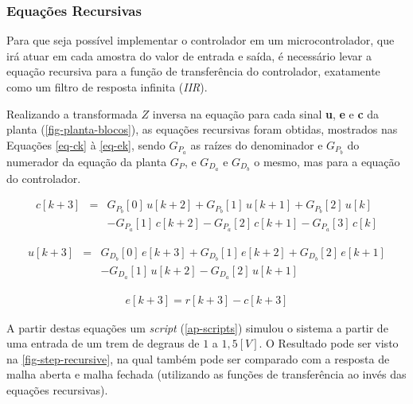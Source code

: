 \documentclass[
	12pt,				%
	article,			%
	openright,			%
	oneside,
	a4paper,			%
	chapter=TITLE,		%
	section=TITLE,		%
	english,			%
	french,				%
	spanish,			%
	brazil,				%
]{abntex2}
\begin{document}
            \subsubsection{Equações Recursivas}
            
                Para que seja possível implementar o controlador em um microcontrolador, que irá atuar em cada amostra do valor de entrada e saída, é necessário levar a equação recursiva para a função de transferência do controlador, exatamente como um filtro de resposta infinita (\textit{IIR}).
                
                Realizando a transformada $Z$ inversa na equação para cada sinal \textbf{u}, \textbf{e} e \textbf{c} da planta (\autoref{fig-planta-blocos}), as equações recursivas foram obtidas, mostrados nas Equações \ref{eq-ck} à \ref{eq-ek}, sendo $G_{P_{a}}$ as raízes do denominador e $G_{P_{b}}$ do numerador da equação da planta $G_P$, e $G_{D_{a}}$ e $G_{D_{b}}$ o mesmo, mas para a equação do controlador.
                
                \begin{eqnarray}
                    \nonumber
                    c[k+3] & = & G_{P_{b}}[0]\,u[k+2] + G_{P_{b}}[1]\,u[k+1] + G_{P_{b}}[2]\,u[k] \\ \label{eq-ck}
                    & &        - G_{P_{a}}[1]\,c[k+2] - G_{P_{a}}[2]\,c[k+1] - G_{P_{a}}[3]\,c[k]
                \end{eqnarray}
                
                \begin{eqnarray}
                    \nonumber
                    u[k+3] & = & G_{D_{b}}[0]\,e[k+3] + G_{D_{b}}[1]\,e[k+2] + G_{D_{b}}[2]\,e[k+1] \\ \label{eq-uk} 
                    & &        - G_{D_{a}}[1]\,u[k+2] - G_{D_{a}}[2]\,u[k+1]
                \end{eqnarray}
                
                \begin{eqnarray}
                    \label{eq-ek}
                    e[k+3] = r[k+3] - c[k+3]
                \end{eqnarray}
                
                A partir destas equações um \textit{script} (\autoref{ap-scripts}) simulou o sistema a partir de uma entrada de um trem de degraus de $1$ a $1,5[V]$. O Resultado pode ser visto na \autoref{fig-step-recursive}, na qual também pode ser comparado com a resposta de malha aberta e malha fechada (utilizando as funções de transferência ao invés das equações recursivas).
                
\end{document}
